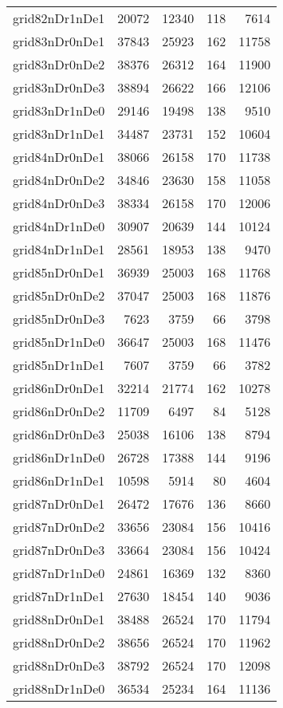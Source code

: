 \begin{longtable}{lrrrr}
grid82nDr1nDe1 & 20072 & 12340 & 118 & 7614 \\
grid83nDr0nDe1 & 37843 & 25923 & 162 & 11758 \\
grid83nDr0nDe2 & 38376 & 26312 & 164 & 11900 \\
grid83nDr0nDe3 & 38894 & 26622 & 166 & 12106 \\
grid83nDr1nDe0 & 29146 & 19498 & 138 & 9510 \\
grid83nDr1nDe1 & 34487 & 23731 & 152 & 10604 \\
grid84nDr0nDe1 & 38066 & 26158 & 170 & 11738 \\
grid84nDr0nDe2 & 34846 & 23630 & 158 & 11058 \\
grid84nDr0nDe3 & 38334 & 26158 & 170 & 12006 \\
grid84nDr1nDe0 & 30907 & 20639 & 144 & 10124 \\
grid84nDr1nDe1 & 28561 & 18953 & 138 & 9470 \\
grid85nDr0nDe1 & 36939 & 25003 & 168 & 11768 \\
grid85nDr0nDe2 & 37047 & 25003 & 168 & 11876 \\
grid85nDr0nDe3 & 7623 & 3759 & 66 & 3798 \\
grid85nDr1nDe0 & 36647 & 25003 & 168 & 11476 \\
grid85nDr1nDe1 & 7607 & 3759 & 66 & 3782 \\
grid86nDr0nDe1 & 32214 & 21774 & 162 & 10278 \\
grid86nDr0nDe2 & 11709 & 6497 & 84 & 5128 \\
grid86nDr0nDe3 & 25038 & 16106 & 138 & 8794 \\
grid86nDr1nDe0 & 26728 & 17388 & 144 & 9196 \\
grid86nDr1nDe1 & 10598 & 5914 & 80 & 4604 \\
grid87nDr0nDe1 & 26472 & 17676 & 136 & 8660 \\
grid87nDr0nDe2 & 33656 & 23084 & 156 & 10416 \\
grid87nDr0nDe3 & 33664 & 23084 & 156 & 10424 \\
grid87nDr1nDe0 & 24861 & 16369 & 132 & 8360 \\
grid87nDr1nDe1 & 27630 & 18454 & 140 & 9036 \\
grid88nDr0nDe1 & 38488 & 26524 & 170 & 11794 \\
grid88nDr0nDe2 & 38656 & 26524 & 170 & 11962 \\
grid88nDr0nDe3 & 38792 & 26524 & 170 & 12098 \\
grid88nDr1nDe0 & 36534 & 25234 & 164 & 11136 \\

\end{longtable}
